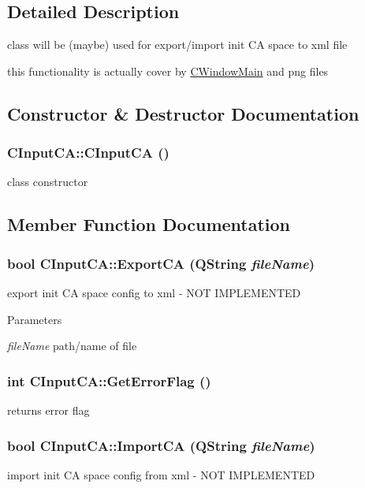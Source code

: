 \subsection{Detailed Description}
class will be (maybe) used for export/import init CA space to xml file

this functionality is actually cover by \hyperlink{classCWindowMain}{CWindowMain} and png files 

\subsection{Constructor \& Destructor Documentation}
\hypertarget{classCInputCA_a8903f80fae371eeb71be05a80be11f8b}{
\subsubsection[{CInputCA}]{\setlength{\rightskip}{0pt plus 5cm}CInputCA::CInputCA ()}}
\label{classCInputCA_a8903f80fae371eeb71be05a80be11f8b}
class constructor 

\subsection{Member Function Documentation}
\hypertarget{classCInputCA_a11c14c3a7eebd8513152cec4aeaee10d}{
\subsubsection[{ExportCA}]{\setlength{\rightskip}{0pt plus 5cm}bool CInputCA::ExportCA (QString {\em fileName})}}
\label{classCInputCA_a11c14c3a7eebd8513152cec4aeaee10d}
export init CA space config to xml -\/ NOT IMPLEMENTED


\begin{DoxyParams}{Parameters}
\item[{\em fileName}]path/name of file \end{DoxyParams}
\hypertarget{classCInputCA_a87c0ff3d984b033bbd1580b3fd6e4dff}{
\subsubsection[{GetErrorFlag}]{\setlength{\rightskip}{0pt plus 5cm}int CInputCA::GetErrorFlag ()}}
\label{classCInputCA_a87c0ff3d984b033bbd1580b3fd6e4dff}
returns error flag \hypertarget{classCInputCA_a42d417afadc4ff816c0555dc41e101bb}{
\subsubsection[{ImportCA}]{\setlength{\rightskip}{0pt plus 5cm}bool CInputCA::ImportCA (QString {\em fileName})}}
\label{classCInputCA_a42d417afadc4ff816c0555dc41e101bb}
import init CA space config from xml -\/ NOT IMPLEMENTED


